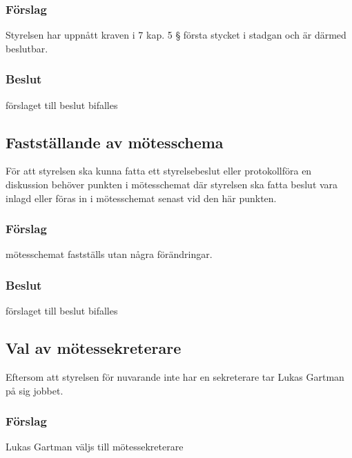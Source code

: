 \documentclass[protokoll]{dvd}
\begin{document}
\subsubsection*{Förslag}

\begin{attsatser}
    \item Styrelsen har uppnått kraven i 7 kap. 5 § första stycket i stadgan och är därmed beslutbar.
\end{attsatser}
\subsubsection*{Beslut}
\begin{attsatser}
    \item förslaget till beslut bifalles
\end{attsatser}


\subsection{Fastställande av mötesschema}

För att styrelsen ska kunna fatta ett styrelsebeslut eller protokollföra en diskussion behöver punkten i mötesschemat där styrelsen ska fatta beslut vara inlagd eller föras in i mötesschemat senast vid den här punkten.

\subsubsection*{Förslag}

\begin{attsatser}
    \item mötesschemat fastställs utan några förändringar.
\end{attsatser}
\subsubsection*{Beslut}
\begin{attsatser}
    \item förslaget till beslut bifalles
\end{attsatser}

\subsection{Val av mötessekreterare}
Eftersom att styrelsen för nuvarande inte har en sekreterare tar Lukas Gartman på sig jobbet.
\subsubsection*{Förslag}
\begin{attsatser}
    \item Lukas Gartman väljs till mötessekreterare
\end{attsatser}
\end{document}
